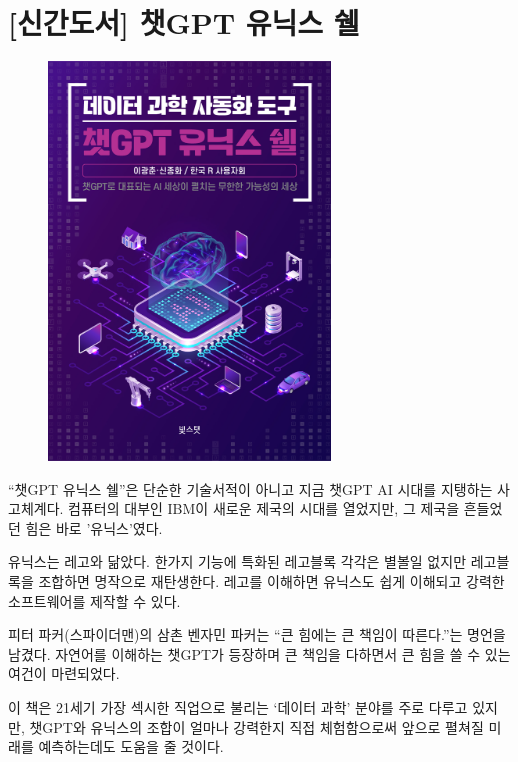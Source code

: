\documentclass[
  letterpaper,
  chapter,a4paper,showtrims,openright,hidelinks]{oblivoir}
\begin{document}
\hypertarget{uxc2e0uxac04uxb3c4uxc11c-uxcc57gpt-uxc720uxb2c9uxc2a4-uxc258}{%
\section*{{[}신간도서{]} 챗GPT 유닉스
쉘}\label{uxc2e0uxac04uxb3c4uxc11c-uxcc57gpt-uxc720uxb2c9uxc2a4-uxc258}}


\begin{figure}

{\centering \includegraphics[width=2.94792in,height=\textheight]{images/unix_shell.jpeg}

}

\end{figure}

``챗GPT 유닉스 쉘''은 단순한 기술서적이 아니고 지금 챗GPT AI 시대를
지탱하는 사고체계다. 컴퓨터의 대부인 IBM이 새로운 제국의 시대를
열었지만, 그 제국을 흔들었던 힘은 바로 '유닉스'였다.

유닉스는 레고와 닮았다. 한가지 기능에 특화된 레고블록 각각은 별볼일
없지만 레고블록을 조합하면 명작으로 재탄생한다. 레고를 이해하면 유닉스도
쉽게 이해되고 강력한 소프트웨어를 제작할 수 있다.

피터 파커(스파이더맨)의 삼촌 벤자민 파커는 ``큰 힘에는 큰 책임이
따른다.''는 명언을 남겼다. 자연어를 이해하는 챗GPT가 등장하며 큰 책임을
다하면서 큰 힘을 쓸 수 있는 여건이 마련되었다.

이 책은 21세기 가장 섹시한 직업으로 불리는 `데이터 과학' 분야를 주로
다루고 있지만, 챗GPT와 유닉스의 조합이 얼마나 강력한지 직접 체험함으로써
앞으로 펼쳐질 미래를 예측하는데도 도움을 줄 것이다.
\end{document}
